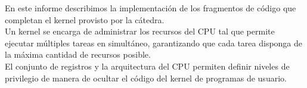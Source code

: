 En este informe describimos la implementación de los fragmentos de código que completan el kernel provisto por la cátedra.\\ 
\indent Un kernel se encarga de administrar los recursos del CPU tal que permite ejecutar múltiples tareas en simultáneo, garantizando que cada tarea disponga de la máxima cantidad de recursos posible.\\
 \indent El conjunto de registros y la arquitectura del CPU permiten definir niveles de privilegio de manera de ocultar el código del kernel de programas de usuario. 
